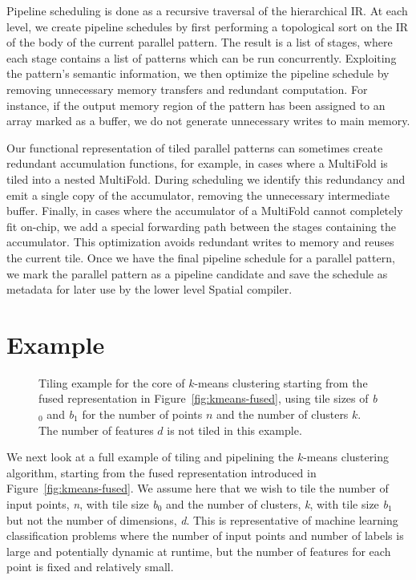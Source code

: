 Pipeline scheduling is done as a recursive traversal of the hierarchical IR.
At each level, we create pipeline schedules by first performing a topological sort on the IR
of the body of the current parallel pattern. The result is a list of stages,
where each stage contains a list of patterns which can be run concurrently.
Exploiting the pattern's semantic information, we then
optimize the pipeline schedule by removing unnecessary memory transfers and redundant computation.
For instance, if the output memory region of the pattern has been assigned to an array marked as a buffer,
we do not generate unnecessary writes to main memory.

Our functional representation of tiled parallel patterns
can sometimes create redundant accumulation functions, for example, in cases where a MultiFold is tiled into a nested MultiFold. During scheduling we identify
this redundancy and emit a single copy of the accumulator, removing the unnecessary intermediate buffer.
Finally, in cases where the accumulator of a MultiFold cannot completely fit on-chip, we add a special
forwarding path between the stages containing the accumulator. This optimization avoids redundant writes to memory and
reuses the current tile.
Once we have the final pipeline schedule for a parallel pattern,
we mark the parallel pattern as a pipeline candidate and save the
schedule as metadata for later use by the lower level Spatial compiler.

\section{Example}

\begin{figure}\small\centering

\caption{Tiling example for the core of $k$-means clustering starting from the
fused representation in Figure~\ref{fig:kmeans-fused}, using tile sizes of
\emph{b$_0$} and \emph{b$_1$} for the number of points $n$ and the number of
clusters $k$. The number of features $d$ is not tiled in this example.}
\label{fig:kmeans-example}
\end{figure}

We next look at a full example of tiling and pipelining
the $k$-means clustering algorithm, starting from the fused representation
introduced in Figure~\ref{fig:kmeans-fused}. We assume here that we wish
to tile the number of input points, \emph{n}, with tile size \emph{b$_0$} and
the number of clusters, \emph{k}, with tile size \emph{b$_1$} but not the
number of dimensions, \emph{d}. This is representative of machine learning
classification problems where the number of input points and number of labels is
large and potentially dynamic at runtime,
but the number of features for each point is fixed and relatively small.

